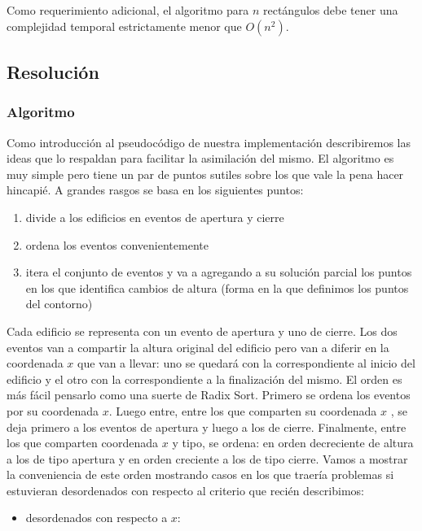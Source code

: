 Como requerimiento adicional, el algoritmo para $n$ rectángulos debe tener una complejidad temporal estrictamente menor que $O(n^2)$.

\subsection{Resoluci\'on}
\subsubsection{Algoritmo}
Como introducción al pseudocódigo de nuestra implementación describiremos las ideas que lo respaldan para facilitar 
la asimilación del mismo. El algoritmo es muy simple pero tiene un par de puntos sutiles sobre los
que vale la pena hacer hincapié. A grandes rasgos se basa en los siguientes puntos:
\begin{enumerate}
	\item divide a los edificios en eventos de apertura y cierre
	\item ordena los eventos convenientemente
	\item itera el conjunto de eventos y va a agregando a su solución parcial los puntos en los que
	identifica cambios de altura (forma en la que definimos los puntos del contorno)
\end{enumerate} 
Cada edificio se representa con un evento de apertura y uno de cierre. Los dos eventos van a compartir la altura
original del edificio pero van a diferir en la coordenada $x$ que van a llevar: uno se quedará con la correspondiente
al inicio del edificio y el otro con la correspondiente a la finalización del mismo. 
El orden es más fácil pensarlo como una suerte de Radix Sort. Primero se ordena los eventos por su coordenada
$x$. Luego entre, entre los que comparten su coordenada $x$ , se deja primero a los eventos de apertura y luego
a los de cierre. Finalmente, entre los que comparten coordenada $x$ y tipo, se ordena: en orden decreciente de altura
a los de tipo apertura y en orden creciente a los de tipo cierre. Vamos a mostrar la conveniencia de este orden
mostrando casos en los que traería problemas si estuvieran desordenados con respecto al criterio que recién describimos:
\begin{itemize}
	\item desordenados con respecto a $x$: 
\end{itemize}
